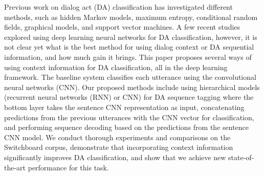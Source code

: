 Previous work on dialog act (DA) classification has investigated different methods, such as hidden Markov models, maximum entropy, conditional random fields, graphical models, and support vector machines. A few recent studies explored using deep learning neural networks for DA classification, however, it is not clear yet what is the best method for using dialog context or DA sequential information, and how much gain it brings. This paper proposes several ways of using context information for DA classification, all in the deep learning framework. The baseline system classifies each utterance using the convolutional neural networks (CNN). Our proposed methods include using hierarchical models (recurrent neural networks (RNN) or CNN) for DA sequence tagging where the bottom layer takes the sentence CNN representation as input, concatenating predictions from the previous utterances with the CNN vector for classification, and performing sequence decoding based on the predictions from the sentence CNN model. We conduct thorough experiments and comparisons on the Switchboard corpus, demonstrate that incorporating context information significantly improves DA classification, and show that we achieve new state-of-the-art performance for this task.

